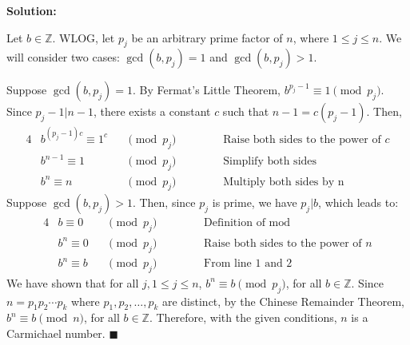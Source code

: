 \documentclass{article}
\newenvironment{solution}
{
\par
\medskip
\color{blue}
\textbf{Solution:}
}
{
\medskip
\par
}
\begin{document}
\begin{enumerate}
\begin{solution}
        \medskip
        Let $b \in \mathbb{Z}$. WLOG, let $p_j$ be an arbitrary prime factor of $n$, where $1 \leq j \leq n$. We will consider two cases: $\gcd(b, p_j) = 1$ and $\gcd(b, p_j) > 1$.

        \medskip
        Suppose $\gcd(b, p_j) = 1$. By Fermat's Little Theorem, $b^{p_j - 1} \equiv 1 \pmod{p_j}$. Since $p_j - 1 \vert n - 1$, there exists a constant $c$ such that $n - 1 = c(p_j - 1)$. Then, 
        \begin{alignat*}{4}
             &b^{(p_j - 1)c} \equiv 1^c &&\pmod{p_j} &&\quad &&\text{Raise both sides to the power of $c$}\\
             &b^{n - 1} \equiv 1 &&\pmod{p_j} &&\quad &&\text{Simplify both sides}\\
             &b^{n} \equiv n &&\pmod{p_j} &&\quad &&\text{Multiply both sides by n}
         \end{alignat*}
         Suppose $\gcd(b, p_j) > 1$. Then, since $p_j$ is prime, we have $p_j \vert b$, which leads to: 
         \begin{alignat*}{4}
             &b \equiv 0 &&\pmod{p_j} &&\quad &&\text{Definition of mod}\\
             &b^{n} \equiv 0 &&\pmod{p_j} &&\quad &&\text{Raise both sides to the power of $n$}\\
             &b^{n} \equiv b &&\pmod{p_j} &&\quad &&\text{From line 1 and 2}
         \end{alignat*}
         We have shown that for all $j, 1 \leq j \leq n$, $b^{n} \equiv b \pmod{p_j}$, for all $b \in \mathbb{Z}$. Since $n = p_1p_2 \cdots p_k$ where $p_1, p_2, \dots, p_k$ are distinct, by the Chinese Remainder Theorem, $b^{n} \equiv b \pmod{n}$, for all $b \in \mathbb{Z}$. Therefore, with the given conditions, $n$ is a Carmichael number. $\blacksquare$
    \end{solution}
\end{enumerate}
\end{document}
